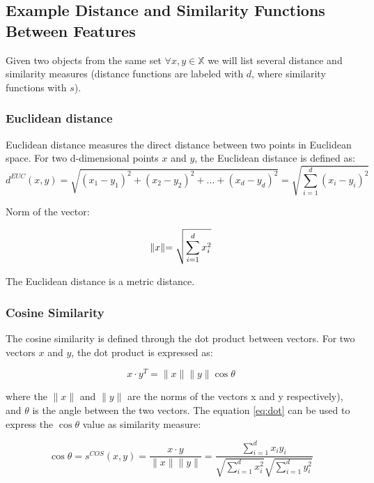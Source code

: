 \subsection{Example Distance and Similarity Functions Between Features}
Given two objects from the same set $\forall x,y \in \mathds{X}$ we will list several distance and similarity measures (distance functions are labeled with $d$, where similarity functions with $s$).
\subsubsection{Euclidean distance}

Euclidean distance measures the direct distance between two points in Euclidean space. For two d-dimensional points $x$ and $y$, the Euclidean distance is defined as:
\begin{equation}
	d^{EUC}(x,y) = \sqrt{(x_{1} - y_{1})^{2} + (x_{2} - y_{2})^{2} + ... + (x_{d} - y_{d})^{2} } = \sqrt{\sum_{i=1}^{d} (x_{i}-y_{i})^{2}}
\end{equation}

  {Norm of the vector}:

\begin{equation}
	\lVert x\lVert = \sqrt{\sum_{i=1}^{d}x_{i}^{2}}
	\title{eq:norm}
\end{equation}

The Euclidean distance is a metric distance\cite{Deza.Deza2009EncyclopediaofDistances}.

\subsubsection{Cosine Similarity}
The cosine similarity is defined through the dot product between vectors. For two vectors $x$ and $y$, the dot product is expressed as:

\begin{equation}
	x\cdot y^{T} = \lVert x\lVert \lVert y\lVert \cos{\theta}
	\label{eq:dot}
\end{equation}


where the $\lVert x\lVert$ and $\lVert y\lVert$ are the norms of the vectors x and y respectively), 
and $\theta$ is the angle between the two vectors.
The equation \ref{eq:dot} can be used to express the $\cos \theta$ value as similarity measure:

\begin{equation}
	\cos \theta = s^{COS}(x,y) = \dfrac{x \cdot y}{\lVert x\lVert \lVert y\lVert} = 
	\dfrac{\sum_{i=1}^{d}x_{i}y_{i}}{\sqrt{\sum_{i=1}^{d} x_{i}^{2}}\sqrt{\sum_{i=1}^{d} y_{i}^{2}}}
	\label{eq:cosine}
\end{equation} 

